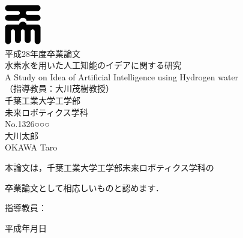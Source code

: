 \begin{center}
  \thispagestyle{empty}
  \includegraphics[clip,width=1.6cm,height=1.8cm]{img/share/cit001.eps}\\
  \Large 平成28年度\quad 卒業論文\\
  \vspace{1.6cm}
  \gt \Huge 水素水を用いた人工知能のイデアに関する研究\\
  A Study on Idea of Artificial Intelligence using Hydrogen water\\
  \vspace{1.0cm}
  \mc \large  （指導教員：大川茂樹教授）\\
  \vspace{3.0cm}
  \gt \Large 千葉工業大学\quad 工学部\\
  \smallskip
  未来ロボティクス学科\\
  \vspace{0.5cm}
  \LARGE No.1326○○○\\
  \vspace{0.5cm}
  \Huge 大川\quad 太郎\\
  \huge OKAWA \quad Taro
\end{center}
\clearpage
\thispagestyle{empty}
\vspace*{2.4cm}

{\LARGE 本論文は，千葉工業大学工学部未来ロボティクス学科の}

\vspace{0.5cm}

{\LARGE 卒業論文として相応しいものと認めます．}\\

\vspace{9cm}

\begin{flushright}
{\LARGE 指導教員：\underline{\hspace{90mm}}}
\end{flushright}

\vspace{0.8cm}

\begin{flushright}
{\LARGE 平成\hspace{1.5cm}年\hspace{1.5cm}月\hspace{1.5cm}日}
\end{flushright}
